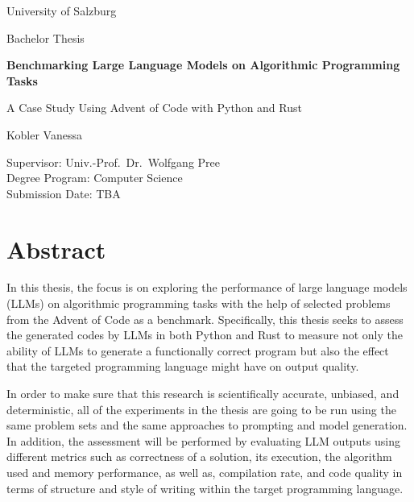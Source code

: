 \documentclass[12pt,a4paper]{report}
\begin{document}
\begin{titlepage}
    \centering
    {\Large University of Salzburg\par}
    \vspace{1cm}
    {\large Bachelor Thesis\par}
    \vspace{2cm}
    {\huge \textbf{Benchmarking Large Language Models on Algorithmic Programming Tasks}\par}
    \vspace{0.5cm}
    {\Large A Case Study Using Advent of Code with Python and Rust\par}
    \vspace{2cm}
    {\large Kobler Vanessa\par}
    \vfill
    \begin{flushleft}
        Supervisor: Univ.-Prof.\ Dr.\ Wolfgang Pree \\
        Degree Program: Computer Science \\
        Submission Date: TBA
    \end{flushleft}
\end{titlepage}


\chapter*{Abstract}In this thesis, the focus is on exploring the performance of large language models (LLMs) on algorithmic programming tasks with the help of selected problems from the Advent of Code as a benchmark. Specifically, this thesis seeks to assess the generated codes by LLMs in both Python and Rust to measure not only the ability of LLMs to generate a functionally correct program but also the effect that the targeted programming language might have on output quality.

In order to make sure that this research is scientifically accurate, unbiased, and deterministic, all of the experiments in the thesis are going to be run using the same problem sets and the same approaches to prompting and model generation. In addition, the assessment will be performed by evaluating LLM outputs using different metrics such as correctness of a solution, its execution, the algorithm used and memory performance, as well as,  compilation rate, and code quality in terms of structure and style of writing within the target programming language.


\tableofcontents
\listoffigures
\listoftables
\end{document}
